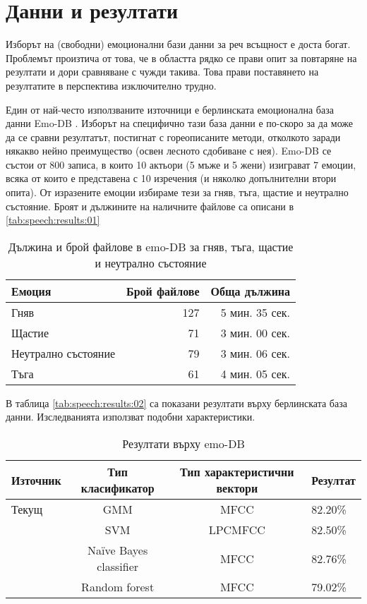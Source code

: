 \documentclass[main.tex]{subfiles}
\begin{document}
\section{Данни и резултати}
Изборът на (свободни) емоционални бази данни за реч всъщност е доста богат. Проблемът произтича от това, че в областта рядко се прави опит за повтаряне на резултати и дори сравняване с чужди такива. Това прави поставянето на резултатите в перспектива изключително трудно. 

Един от най-често използваните източници е берлинската емоционална база данни Emo-DB \cite{berlin}. Изборът на специфично тази база данни е по-скоро за да може да се сравни резултатът, постигнат с гореописаните методи, отколкото заради някакво нейно преимущество (освен лесното сдобиване с нея). Emo-DB се състои от 800 записа, в които 10 актьори (5 мъже и 5 жени) изиграват 7 емоции, всяка от които е представена с 10 изречения (и няколко допълнителни втори опита). От изразените емоции избираме тези за гняв, тъга, щастие и неутрално състояние. Броят и дължините на наличните файлове са описани в \autoref{tab:speech:results:01}

\begin{table}[h]
    \begin{center}
    \begin{tabular}{|l|r|r|} 
        \hline
        Емоция & Брой файлове & Обща дължина\\ 
        \hline
        Гняв & 127 & 5 мин. 35 сек.\\ 
        Щастие &  71 & 3 мин. 00 сек.\\ 
        Неутрално състояние &  79 & 3 мин. 06 сек.\\ 
        Тъга &  61 & 4 мин. 05 сек.\\ 
        \hline
    \end{tabular}
    \caption{Дължина и брой файлове в emo-DB за гняв, тъга, щастие и неутрално състояние}
    \label{tab:speech:results:01}
    \end{center}
\end{table}

В таблица \autoref{tab:speech:results:02} са показани резултати върху берлинската база данни. Изследванията използват подобни характеристики.
\begin{table}[h]
\begin{center}
    \begin{tabular}{ |l|c|c|l| } 
     \hline
     Източник & Тип класификатор &  Тип характеристични вектори & Резултат \\ 
     \hline
     Текущ & GMM & MFCC & 82.20\% \\ 
     \cite{first} & SVM & LPCMFCC & 82.50\% \\ 
     \cite{second} &  Naïve Bayes classifier & MFCC & 82.76\% \\ 
     \cite{third} &  Random forest & MFCC & 79.02\% \\ 
     \hline
    \end{tabular}
    \caption{Резултати върху emo-DB}
    \label{tab:speech:results:02}
    \end{center}
\end{table}
\end{document}
